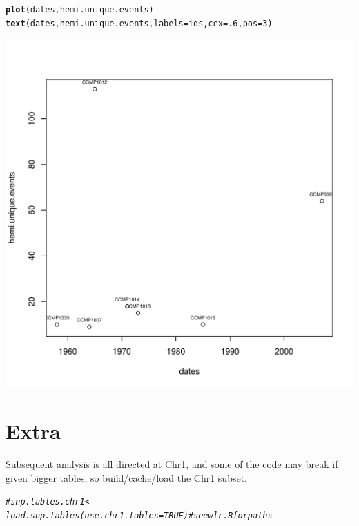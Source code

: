 \documentclass{article}\usepackage[]{graphicx}\usepackage[]{color}
\makeatletter
\def\maxwidth{ %
  \ifdim\Gin@nat@width>\linewidth
    \linewidth
  \else
    \Gin@nat@width
  \fi
}
\newcommand{\hlnum}[1]{\textcolor[rgb]{0.686,0.059,0.569}{#1}}%
\newcommand{\hlcom}[1]{\textcolor[rgb]{0.678,0.584,0.686}{\textit{#1}}}%
\newcommand{\hlstd}[1]{\textcolor[rgb]{0.345,0.345,0.345}{#1}}%
\newcommand{\hlkwc}[1]{\textcolor[rgb]{0.333,0.667,0.333}{#1}}%
\newcommand{\hlkwd}[1]{\textcolor[rgb]{0.737,0.353,0.396}{\textbf{#1}}}%
\newenvironment{kframe}{%
 \def\at@end@of@kframe{}%
 \ifinner\ifhmode%
  \def\at@end@of@kframe{\end{minipage}}%
  \begin{minipage}{\columnwidth}%
 \fi\fi%
 \def\FrameCommand##1{\hskip\@totalleftmargin \hskip-\fboxsep
 \colorbox{shadecolor}{##1}\hskip-\fboxsep
     \hskip-\linewidth \hskip-\@totalleftmargin \hskip\columnwidth}%
 \MakeFramed {\advance\hsize-\width
   \@totalleftmargin\z@ \linewidth\hsize
   \@setminipage}}%
 {\par\unskip\endMakeFramed%
 \at@end@of@kframe}
\newenvironment{knitrout}{}{} %
\makeatother
\begin{document}
\begin{knitrout}\footnotesize
{}\color{fgcolor}\begin{kframe}
\begin{alltt}
\hlkwd{plot}\hlstd{(dates,hemi.unique.events)}
\hlkwd{text}\hlstd{(dates,hemi.unique.events,}\hlkwc{labels}\hlstd{=ids,}\hlkwc{cex}\hlstd{=}\hlnum{.6}\hlstd{,}\hlkwc{pos}\hlstd{=}\hlnum{3}\hlstd{)}
\end{alltt}
\end{kframe}

{\centering \includegraphics[width=\maxwidth]{figs-knitr/unnamed-chunk-63-1} 

}



\end{knitrout}

\iffalse

\section{Extra}

Subsequent analysis is all directed at Chr1, and some of the code may break if given bigger tables, so 
build/cache/load the Chr1 subset.

\begin{knitrout}\footnotesize
{}\color{fgcolor}\begin{kframe}
\begin{alltt}
\hlcom{#snp.tables.chr1 <- load.snp.tables(use.chr1.tables=TRUE) # see wlr.R for paths}
\end{alltt}
\end{kframe}
\end{knitrout}
\end{document}
